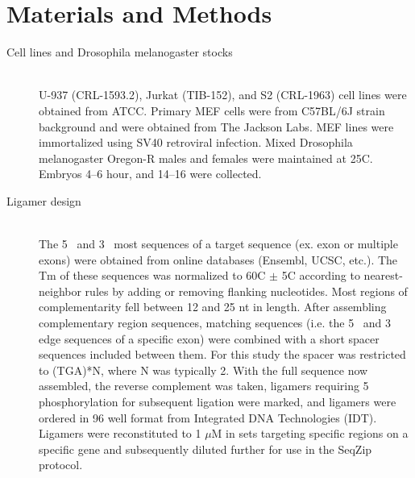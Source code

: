 {\section{Materials and Methods}\label{c2sec: Methods}

  \begin{description}
  	\item[Cell lines and Drosophila melanogaster stocks] \hfill \\
		
		U-937 (CRL-1593.2), Jurkat (TIB-152), and S2 (CRL-1963) cell lines were obtained from ATCC. Primary MEF cells were from C57BL/6J strain background and were obtained from The Jackson Labs. MEF lines were immortalized using SV40 retroviral infection. Mixed Drosophila melanogaster Oregon-R males and females were maintained at 25\degree C. Embryos 4–6 hour, and 14–16 were collected. 

		\item[Ligamer design] \hfill \\
		The 5\textprime~ and 3\textprime~ most sequences of a target sequence (ex. exon or multiple exons) were obtained from online databases (Ensembl, UCSC, etc.). The Tm of these sequences was normalized to 60\degree C $\pm$ 5\degree C according to nearest-neighbor rules \citep{Xia1998} by adding or removing flanking nucleotides. Most regions of complementarity fell between 12 and 25 nt in length. After assembling complementary region sequences, matching sequences (i.e. the 5\textprime~ and 3\textprime~ edge sequences of a specific exon) were combined with a short spacer sequences included between them. For this study the spacer was restricted to (TGA)*N, where N was typically 2. With the full sequence now assembled, the reverse complement was taken, ligamers requiring 5\textprime~ phosphorylation for subsequent ligation were marked, and ligamers were ordered in 96 well format from Integrated DNA Technologies (IDT). Ligamers were reconstituted to 1 $\mu$M in sets targeting specific regions on a specific gene and subsequently diluted further for use in the SeqZip protocol.


\end{description}}
